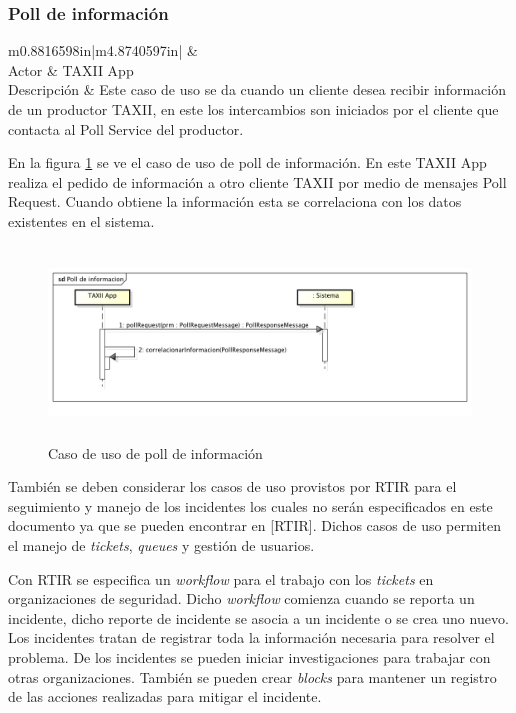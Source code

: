 \subsubsection{Poll de información}
\begin{flushleft}
	\tablefirsthead{}
	\tablehead{}
	\tabletail{}
	\tablelasttail{}
	\begin{supertabular}{m{0.8816598in}|m{4.8740597in}|}
		 &
		\\\hline
		{Actor} &
		{TAXII App}\\
		{Descripción} &
		{Este caso de uso se da cuando un cliente desea recibir información de un
			productor TAXII, en este los intercambios son iniciados por el cliente que contacta al Poll Service del
			productor.}\\\hhline{~-}
	\end{supertabular}
\end{flushleft}

\bigskip

En la figura \ref{fig.pollinfo} se ve el caso de uso de poll de información. En este TAXII App realiza el pedido de información a otro
cliente TAXII por medio de mensajes Poll Request. Cuando obtiene la información esta se correlaciona con los datos
existentes en el sistema.

\begin{figure}[H]
	\centering  \includegraphics[width=5.7638in,height=2.0154in]{Analisis22-img/Analisis22-img030.png}
	\caption{Caso de uso de poll de
		información}
	\label{fig.pollinfo}
\end{figure}
	
\bigskip

	También se deben considerar los casos de uso provistos por RTIR para el seguimiento y manejo de los incidentes los
	cuales no serán especificados en este documento ya que se pueden encontrar en \foreignlanguage{spanish}{[RTIR]}. Dichos
	casos de uso permiten el manejo de \textit{tickets}, \textit{queues }y gestión de usuarios.

	Con RTIR se especifica un \textit{workflow} para el trabajo con los \textit{tickets} en organizaciones de seguridad.
	Dicho \textit{workflow} comienza cuando se reporta un incidente, dicho reporte de incidente se asocia a un incidente o
	se crea uno nuevo. Los incidentes tratan de registrar toda la información necesaria para resolver el problema. De los
	incidentes se pueden iniciar investigaciones para trabajar con otras organizaciones. También se pueden crear
	\textit{blocks} para mantener un registro de las acciones realizadas para mitigar el incidente.

% 
%
